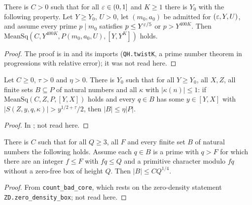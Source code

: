 \begin{lemma}\label{host:mean-sq}
There is $C>0$ such that for all $\varepsilon\in(0,1]$ and $K\ge1$ there is $Y_0$
with the following property. Let $Y\ge Y_0$, $U>0$, let $(m_0,a_0)$ be
admitted for $(\varepsilon,Y,U)$, and assume every prime $p\mid m_0$ satisfies
$p\le Y^{\varepsilon/5}$ or $p>Y^{400K}$. Then
$\mathrm{MeanSq}(C,Y^{400K},P(m_0,a_0,U),[Y,Y^K])$ holds.
\end{lemma}
\begin{proof}
The proof is in 
and its imports (\texttt{QH.twistK}, a prime number theorem in progressions
with relative error); it was not read here.
\end{proof}

\begin{lemma}\label{host:bad-share}
Let $C\ge0$, $\tau>0$ and $\eta>0$. There is $Y_0$ such that for all
$Y\ge Y_0$, all $X,Z$, all finite sets $B\subseteq P$ of natural numbers and
all $\kappa$ with $|\kappa(n)|\le1$: if $\mathrm{MeanSq}(C,Z,P,[Y,X])$ holds
and every $q\in B$ has some $y\in[Y,X]$ with
$|S(Z,y,q,\kappa)|>y^{1/2+\tau}/2$, then $|B|\le\eta|P|$.
\end{lemma}
\begin{proof}
In ;
not read here.
\end{proof}

\begin{lemma}\label{host:count-bad}
There is $C$ such that for all $Q\ge3$, all $F$ and every finite set $B$ of
natural numbers the following holds. Assume each $q\in B$ is a prime with
$q>F$ for which there are an integer $f\le F$ with $fq\le Q$ and a primitive
character modulo $fq$ without a zero-free box of height $Q$. Then
$|B|\le CQ^{1/4}$.
\end{lemma}
\begin{proof}
From \texttt{count\_bad\_core}, which rests on the zero-density statement
\texttt{ZD.zero\_density\_box}; not read here.
\end{proof}

